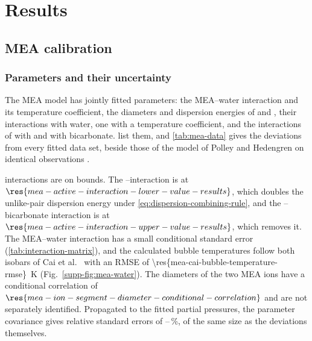 \section{Results}\label{sec:results}
\subsection{MEA calibration}\label{sec:results-mea}
\subsubsection{Parameters and their uncertainty}\label{sec:results-parameters}
The MEA model has  jointly fitted parameters: the MEA--water interaction and its temperature coefficient, the diameters and dispersion energies of \MEAH and \MEACOO, their interactions with water, one with a temperature coefficient, and the interactions of \MEAH with \MEACOO and with bicarbonate.
 list them, and \cref{tab:mea-data} gives the deviations from every fitted data set, beside those of the model of Polley and Hedengren on identical observations \cite{polleyReactiveEPCSAFTModeling2026}.




 interactions are on bounds.
The \MEAH--\MEACOO interaction is at $\res{mea-active-interaction-lower-value-results}$, which doubles the unlike-pair dispersion energy under \cref{eq:dispersion-combining-rule}, and the \MEAH--bicarbonate interaction is at $\res{mea-active-interaction-upper-value-results}$, which removes it.
The MEA--water interaction has a small conditional standard error (\cref{tab:interaction-matrix}), and the calculated bubble temperatures follow both isobars of Cai et al.\ \cite{caiBinaryIsobaricVaporLiquid1996} with an RMSE of \SI{\res{mea-cai-bubble-temperature-rmse}}{\kelvin} (Fig.~\ref{supp-fig:mea-water}).
The diameters of the two MEA ions have a conditional correlation of $\res{mea-ion-segment-diameter-conditional-correlation}$ and are not separately identified.
Propagated to the  fitted \COtwo partial pressures, the parameter covariance gives relative standard errors of --\,\%, of the same size as the deviations themselves.

